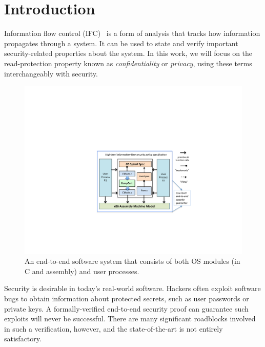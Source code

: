 \section{Introduction}
\label{intro}

Information flow control (IFC)~\cite{myers-liskov,sabelfeld03} is a
form of analysis that tracks how information
propagates through a system. It can be used to state and verify
important security-related properties about the system.  In this work,
we will focus on the read-protection property known as
\emph{confidentiality} or \emph{privacy}, using these terms
interchangeably with security.

\begin{figure}[t]
\begin{center}
\includegraphics[scale=0.685]{pldi/figure/osmach}
\caption{\small An end-to-end software system that consists 
of both OS modules (in C and assembly) and user processes.}
\label{fig:osmach}
\end{center}
\end{figure}

Security is desirable in today's real-world software.
Hackers often exploit software bugs to 
obtain information about protected secrets, such as user
passwords or private keys. A formally-verified end-to-end
security proof can guarantee such exploits will never be
successful. There are many significant roadblocks involved
in such a verification, however, and the state-of-the-art
is not entirely satisfactory.
 

